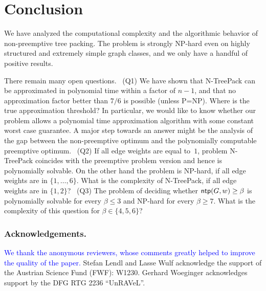 \documentclass[runningheads]{llncs}
\newcommand{\set}[1]{\{ #1 \}}
\newcommand{\fromto}[2]{\set{#1, \ldots, #2}}
\newcommand{\xxxNTP}{{\sc N-TreePack}}
\DeclareMathOperator{\ntp}{\text{\sf ntp}}
\newcommand{\lasse}[1]{\textcolor{blue}{#1}}
\begin{document}


\section{Conclusion}
\label{sec:conclusion}
We have analyzed the computational complexity and the algorithmic behavior of non-preemptive
tree packing.
The problem is strongly NP-hard even on highly structured and extremely simple graph classes,
and we only have a handful of positive results.

There remain many open questions.
~(Q1) We have shown that {\xxxNTP} can be approximated in polynomial time within a factor of $n-1$, 
and that no approximation factor better than $7/6$ is possible (unless P=NP).
Where is the true approximation threshold?
In particular, we would like to know whether our problem allows a polynomial time approximation
algorithm with some constant worst case guarantee.
A major step towards an answer might be the analysis of the gap between the non-preemptive optimum 
and the polynomially computable preemptive optimum.
~(Q2) If all edge weights are equal to~$1$, problem {\xxxNTP} coincides with the preemptive problem 
version and hence is polynomially solvable.
On the other hand the problem is NP-hard, if all edge weights are in $\fromto{1}{6}$. 
What is the complexity of {\xxxNTP}, if all edge weights are in $\{1,2\}$?
~(Q3) The problem of deciding whether $\ntp(G,w)\ge\beta$ is polynomially solvable for 
every $\beta\le3$ and NP-hard for every $\beta\ge7$.
What is the complexity of this question for $\beta\in\{4,5,6\}$?


\subsubsection*{Acknowledgements.}
\lasse{We thank the anonymous reviewers, whose comments greatly helped to improve the quality of the paper.} Stefan Lendl and Lasse Wulf acknowledge the support of the Austrian Science Fund (FWF): W1230.
Gerhard Woeginger acknowledges support by the DFG RTG 2236 ``UnRAVeL''.

%
%





\end{document}
